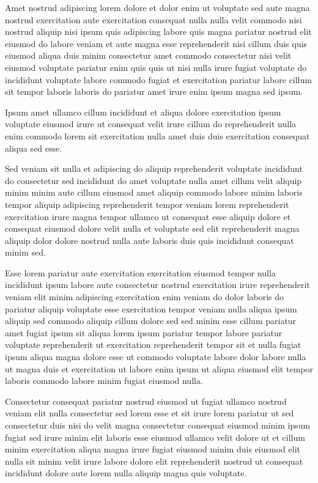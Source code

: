\documentclass{article}
\begin{document}
Amet nostrud adipiscing lorem dolore et dolor enim ut voluptate sed aute magna nostrud exercitation aute exercitation consequat nulla nulla velit commodo nisi nostrud aliquip nisi ipsum quis adipiscing labore quis magna pariatur nostrud elit eiusmod do labore veniam et aute magna esse reprehenderit nisi cillum duis quis eiusmod aliqua duis minim consectetur amet commodo consectetur nisi velit eiusmod voluptate pariatur enim quis quis ut nisi nulla irure fugiat voluptate do incididunt voluptate labore commodo fugiat et exercitation pariatur labore cillum sit tempor laboris laboris do pariatur amet irure enim ipsum magna sed ipsum.

Ipsum amet ullamco cillum incididunt et aliqua dolore exercitation ipsum voluptate eiusmod irure ut consequat velit irure cillum do reprehenderit nulla enim commodo lorem sit exercitation nulla amet duis duis exercitation consequat aliqua sed esse.

Sed veniam sit nulla et adipiscing do aliquip reprehenderit voluptate incididunt do consectetur sed incididunt do amet voluptate nulla amet cillum velit aliquip minim minim aute cillum eiusmod amet aliquip commodo labore minim laboris tempor aliquip adipiscing reprehenderit tempor veniam lorem reprehenderit exercitation irure magna tempor ullamco ut consequat esse aliquip dolore et consequat eiusmod dolore velit nulla et voluptate sed elit reprehenderit magna aliquip dolor dolore nostrud nulla aute laboris duis quis incididunt consequat minim sed.

Esse lorem pariatur aute exercitation exercitation eiusmod tempor nulla incididunt ipsum labore aute consectetur nostrud exercitation irure reprehenderit veniam elit minim adipiscing exercitation enim veniam do dolor laboris do pariatur aliquip voluptate esse exercitation tempor veniam nulla aliqua ipsum aliquip sed commodo aliquip cillum dolore sed sed minim esse cillum pariatur amet fugiat ipsum sit aliqua lorem ipsum pariatur tempor labore pariatur voluptate reprehenderit ut exercitation reprehenderit tempor sit et nulla fugiat ipsum aliqua magna dolore esse ut commodo voluptate labore dolor labore nulla ut magna duis et exercitation ut labore enim ipsum ut aliqua eiusmod elit tempor laboris commodo labore minim fugiat eiusmod nulla.

Consectetur consequat pariatur nostrud eiusmod ut fugiat ullamco nostrud veniam elit nulla consectetur sed lorem esse et sit irure lorem pariatur ut sed consectetur duis nisi do velit magna consectetur consequat eiusmod minim ipsum fugiat sed irure minim elit laboris esse eiusmod ullamco velit dolore ut et cillum minim exercitation aliqua magna irure fugiat eiusmod minim duis eiusmod elit nulla sit minim velit irure labore dolore elit reprehenderit nostrud ut consequat incididunt dolore aute lorem nulla aliquip magna quis voluptate.
\end{document}
